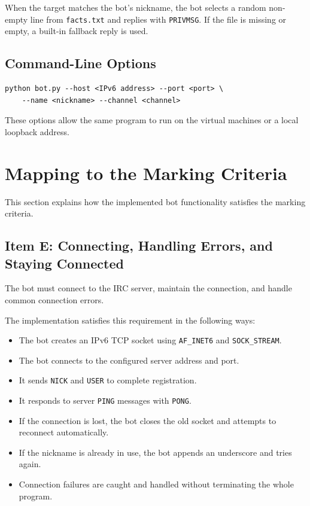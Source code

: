 \documentclass[a4paper,12pt]{article}
\begin{document}
When the target matches the bot's nickname, the bot selects a random non-empty line from \texttt{facts.txt} and replies with \texttt{PRIVMSG}. If the file is missing or empty, a built-in fallback reply is used.

\subsection{Command-Line Options}

\begin{verbatim}
python bot.py --host <IPv6 address> --port <port> \
    --name <nickname> --channel <channel>
\end{verbatim}

These options allow the same program to run on the virtual machines or a local loopback address.

\section{Mapping to the Marking Criteria}

This section explains how the implemented bot functionality satisfies the marking criteria.

\subsection{Item E: Connecting, Handling Errors, and Staying Connected}

The bot must connect to the IRC server, maintain the connection, and handle common connection errors.

The implementation satisfies this requirement in the following ways:

\begin{itemize}
    \item The bot creates an IPv6 TCP socket using \texttt{AF\_INET6} and \texttt{SOCK\_STREAM}.
    \item The bot connects to the configured server address and port.
    \item It sends \texttt{NICK} and \texttt{USER} to complete registration.
    \item It responds to server \texttt{PING} messages with \texttt{PONG}.
    \item If the connection is lost, the bot closes the old socket and attempts to reconnect automatically.
    \item If the nickname is already in use, the bot appends an underscore and tries again.
    \item Connection failures are caught and handled without terminating the whole program.
\end{itemize}
\end{document}

